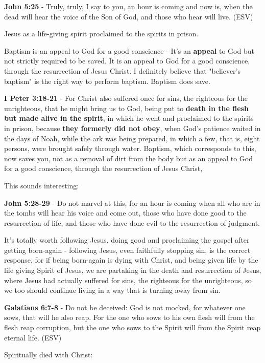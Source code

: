 \documentclass[11pt]{article}
\begin{document}
\textbf{John 5:25} - Truly, truly, I say to you, an hour is coming and now is, when the dead will hear the voice of the Son of God, and those who hear will live. (ESV)

Jesus as a life-giving spirit proclaimed to the spirits in prison.

Baptism is an appeal to God for a good conscience - It's an \textbf{appeal} to God but not strictly required to be saved.
It is an appeal to God for a good conscience, through the resurrection of Jesus Christ.
I definitely believe that "believer's baptism" is the right way to perform baptism.
Baptism does save.

\textbf{I Peter 3:18-21} - For Christ also suffered once for sins, the righteous for the unrighteous, that he might bring us to God, being put to \textbf{death in the flesh but made alive in the spirit}, in which he went and proclaimed to the spirits in prison, because \textbf{they formerly did not obey}, when God's patience waited in the days of Noah, while the ark was being prepared, in which a few, that is, eight persons, were brought safely through water. Baptism, which corresponds to this, now saves you, not as a removal of dirt from the body but as an appeal to God for a good conscience, through the resurrection of Jesus Christ,

This sounds interesting:

\textbf{John 5:28-29} - Do not marvel at this, for an hour is coming when all who are in the tombs will hear his voice and come out, those who have done good to the resurrection of life, and those who have done evil to the resurrection of judgment.

It's totally worth following Jesus, doing good and proclaiming the gospel after getting born-again - following Jesus, even faithfully stopping sin, is the correct response,
for if being born-again is dying with Christ, and being given life by the life giving Spirit of Jesus,
we are partaking in the death and resurrection of Jesus, where Jesus had actually suffered for sins, the righteous for the unrighteous, so we too should continue living in a way that is turning away from sin.

\textbf{Galatians 6:7-8} - Do not be deceived: God is not mocked, for whatever one sows, that will he also reap. For the one who sows to his own flesh will from the flesh reap corruption, but the one who sows to the Spirit will from the Spirit reap eternal life. (ESV)

Spiritually died with Christ:
\end{document}

